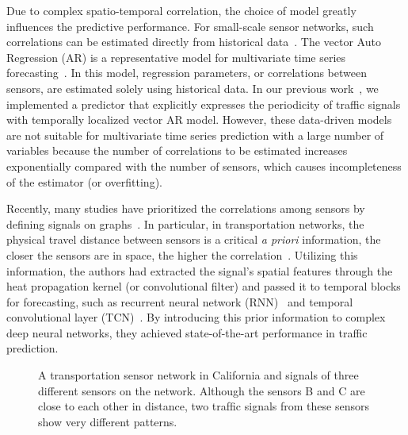 \documentclass[journal]{IEEEtran}
\begin{document}
Due to complex spatio-temporal correlation, the choice of model greatly influences the predictive performance.
For small-scale sensor networks, such correlations can be estimated directly from historical data~\cite{chandra2009predictions,mai2012multivariate,kwak2020travel,cavalcante2017lasso, nicholson2020high}.
The vector Auto Regression (AR) is a representative model for multivariate time series forecasting~\cite{kwak2020travel,cavalcante2017lasso, nicholson2020high}. 
In this model, regression parameters, or correlations between sensors, are estimated solely using historical data. In our previous work~\cite{kwak2020travel}, we implemented a predictor that explicitly expresses the periodicity of traffic signals with temporally localized vector AR model.
However, these data-driven models are not suitable for multivariate time series prediction with a large number of variables because the number of correlations to be estimated increases exponentially compared with the number of sensors, which causes incompleteness of the estimator (or overfitting).

Recently, many studies have prioritized the correlations among sensors by defining signals on graphs~\cite{li2018diffusion,yu2018spatio,cui2019traffic,zhao2019t,chen2019gated,zhang2019spatial, xu2018graph, wu2019graph, wu2020connecting}. 
In particular, in transportation networks, the physical travel distance between sensors is a critical {\it{a priori}} information, the closer the sensors are in space, the higher the correlation~\cite{battaglia2018relational}.
Utilizing this information, the authors had extracted the signal's spatial features through the heat propagation kernel (or convolutional filter) and passed it to temporal blocks for forecasting, such as recurrent neural network (RNN)~\cite{li2018diffusion, cui2019traffic, chen2019gated, zhang2019spatial} and temporal convolutional layer (TCN)~\cite{yu2018spatio, zhao2019t, wu2019graph, wu2020connecting}.
By introducing this prior information to complex deep neural networks, they  achieved state-of-the-art performance in traffic prediction.

\begin{figure}[!t]
   \centering
   \caption{A transportation sensor network in California and signals of three different sensors on the network.
   Although the sensors B and C are close to each other in distance, two trafﬁc signals from these sensors show very different patterns.
  }
   \label{fig:sensornetwork}
\end{figure} 
\end{document}

